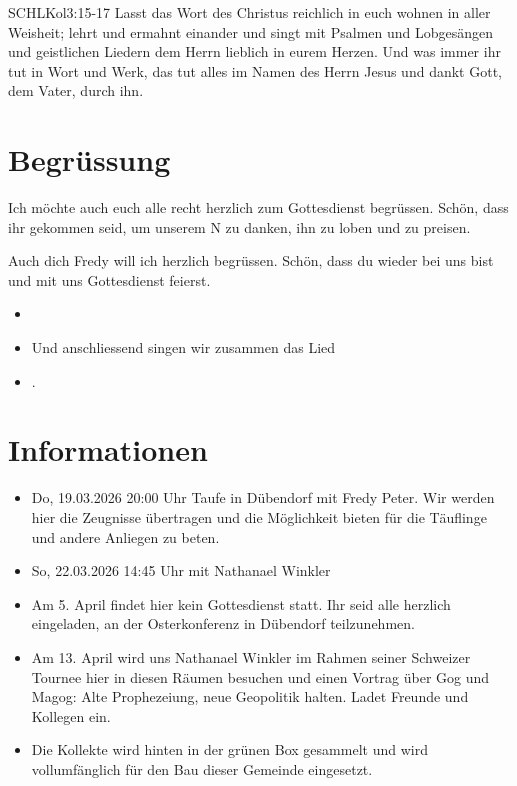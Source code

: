 \documentclass[fontsize=14pt]{mybib}
\newcommand{\Name}{Fredy}
\begin{document}
\begin{bibelbox}{SCHL}{Kol}{3:15-17}
    Lasst das Wort des Christus reichlich in euch wohnen in aller Weisheit; lehrt und ermahnt einander und singt mit Psalmen und Lobgesängen und geistlichen Liedern dem Herrn lieblich in eurem Herzen. Und was immer ihr tut in Wort und Werk, das tut alles im Namen des Herrn Jesus und dankt Gott, dem Vater, durch ihn.
\end{bibelbox}
\section{Begrüssung}
Ich möchte auch euch alle recht herzlich zum Gottesdienst begrüssen. Schön, dass ihr gekommen seid, um unserem \herr N zu danken, ihn zu loben und zu preisen.

Auch dich \Name{} will ich herzlich begrüssen. Schön, dass du wieder bei uns bist und mit uns Gottesdienst feierst.
\begin{itemize}
    \item[] 
    \item[] Und anschliessend singen wir zusammen das Lied
    \item[] .
\end{itemize}

\section{Informationen}
\begin{itemize}
    \item {} Do, 19.03.2026 20:00 Uhr Taufe in Dübendorf mit Fredy Peter. Wir werden hier die Zeugnisse übertragen und die Möglichkeit bieten für die Täuflinge und andere Anliegen zu beten.
    \item {} So, 22.03.2026 14:45 Uhr mit Nathanael Winkler
    \item {} Am 5. April findet hier kein Gottesdienst statt. Ihr seid alle herzlich eingeladen, an der Osterkonferenz in Dübendorf teilzunehmen.
    \item {} Am 13. April wird uns Nathanael Winkler im Rahmen seiner Schweizer Tournee hier in diesen Räumen besuchen und einen Vortrag über Gog und Magog: Alte Prophezeiung, neue Geopolitik halten. Ladet Freunde und Kollegen ein.
    \item {} Die Kollekte wird hinten in der grünen Box gesammelt und wird vollumfänglich für den Bau dieser Gemeinde eingesetzt.
\end{itemize}
\end{document}
